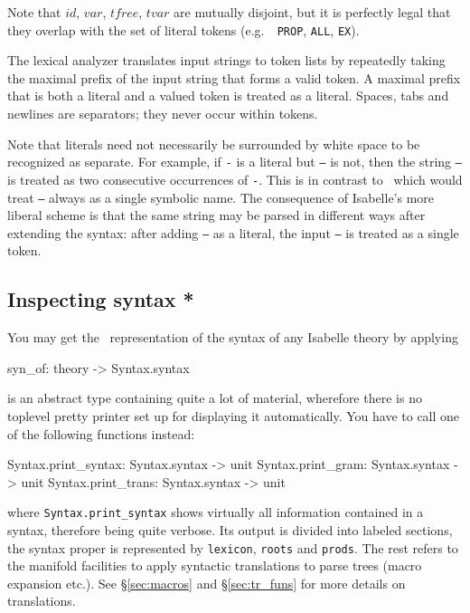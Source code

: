 Note that $id$, $var$, $tfree$, $tvar$ are mutually disjoint, but it is
perfectly legal that they overlap with the set of literal tokens (e.g.\ {\tt
PROP}, {\tt ALL}, {\tt EX}).

The lexical analyzer translates input strings to token lists by repeatedly
taking the maximal prefix of the input string that forms a valid token. A
maximal prefix that is both a literal and a valued token is treated as a
literal. Spaces, tabs and newlines are separators; they never occur within
tokens.

Note that literals need not necessarily be surrounded by white space to be
recognized as separate. For example, if {\tt -} is a literal but {\tt --} is
not, then the string {\tt --} is treated as two consecutive occurrences of
{\tt -}. This is in contrast to \ML\ which would treat {\tt --} always as a
single symbolic name. The consequence of Isabelle's more liberal scheme is
that the same string may be parsed in different ways after extending the
syntax: after adding {\tt --} as a literal, the input {\tt --} is treated as
a single token.


\subsection{Inspecting syntax *}

You may get the \ML\ representation of the syntax of any Isabelle theory by
applying 
\begin{ttbox}
  syn_of: theory -> Syntax.syntax
\end{ttbox}
 is an abstract type containing quite a lot of
material, wherefore there is no toplevel pretty printer set up for displaying
it automatically. You have to call one of the following functions instead:
 
\begin{ttbox}
  Syntax.print_syntax: Syntax.syntax -> unit
  Syntax.print_gram: Syntax.syntax -> unit
  Syntax.print_trans: Syntax.syntax -> unit
\end{ttbox}
where {\tt Syntax.print_syntax} shows virtually all information contained in
a syntax, therefore being quite verbose. Its output is divided into labeled
sections, the syntax proper is represented by {\tt lexicon}, {\tt roots} and
{\tt prods}. The rest refers to the manifold facilities to apply syntactic
translations to parse trees (macro expansion etc.). See \S\ref{sec:macros}
and \S\ref{sec:tr_funs} for more details on translations.

